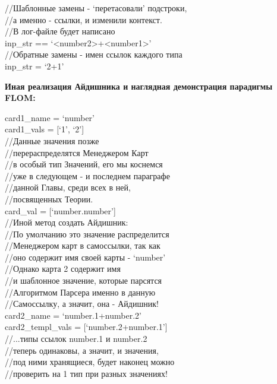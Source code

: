 \documentclass{book}
\newcommand{\less}{\textless}
\newcommand{\more}{\textgreater}
\begin{document}
\begin{tcolorbox}[breakable]
//Шаблонные замены - `перетасовали' подстроки, \\
//а именно - ссылки, и изменили контекст. \\
//В лог-файле будет написано \\
inp\_str == `\less number2\more+\less number1\more' \\

//Обратные замены - имен ссылок каждого типа \\
inp\_str = `2+1'
\end{tcolorbox}

\textbf{Иная реализация Айдишника и наглядная демонстрация парадигмы FLOM:}

\begin{tcolorbox}[breakable]
card1\_name = `number' \\
card1\_vals = [`1', `2'] \\
//Данные значения позже \\
//перераспределятся Менеджером Карт \\
//в особый тип Значений, его мы коснемся \\
//уже в следующем - и последнем параграфе \\
//данной Главы, среди всех в ней, \\
//посвященных Теории. \\
card\_val = [`number.number'] \\
//Иной метод создать Айдишник: \\
//По умолчанию это значение распределится \\
//Менеджером карт в самоссылки, так как \\
//оно содержит имя своей карты - `number' \\
//Однако карта 2 содержит имя \\
//и шаблонное значение, которые парсятся \\
//Алгоритмом Парсера именно в данную \\
//Самоссылку, а значит, она - Айдишник! \\

card2\_name = `number.1+number.2' \\
card2\_templ\_vals = [`number.2+number.1'] \\
//...типы ссылок number.1 и number.2 \\
//теперь одинаковы, а значит, и значения, \\
//под ними хранящиеся, будет наконец можно \\
//проверить на 1 тип при разных значениях! \\


\end{tcolorbox}
\end{document}
